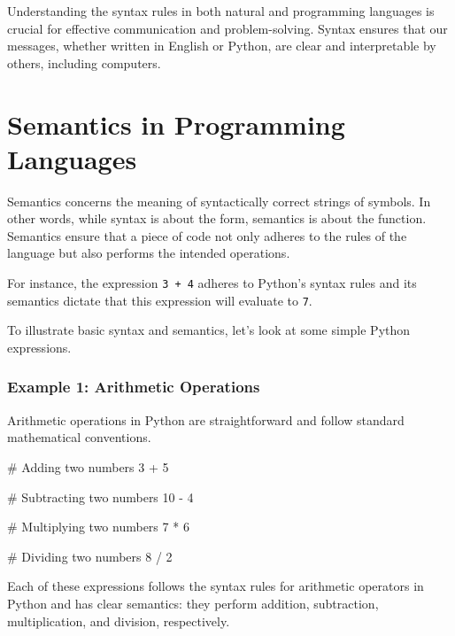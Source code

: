 \documentclass[
  letterpaper,
  DIV=11,
  numbers=noendperiod]{scrreprt}
\newenvironment{Shaded}{\begin{snugshade}}{\end{snugshade}}
\newcommand{\CommentTok}[1]{\textcolor[rgb]{0.37,0.37,0.37}{#1}}
\newcommand{\DecValTok}[1]{\textcolor[rgb]{0.68,0.00,0.00}{#1}}
\newcommand{\OperatorTok}[1]{\textcolor[rgb]{0.37,0.37,0.37}{#1}}
\begin{document}
Understanding the syntax rules in both natural and programming languages
is crucial for effective communication and problem-solving. Syntax
ensures that our messages, whether written in English or Python, are
clear and interpretable by others, including computers.

\hypertarget{semantics-in-programming-languages}{%
\section{Semantics in Programming
Languages}\label{semantics-in-programming-languages}}

Semantics concerns the meaning of syntactically correct strings of
symbols. In other words, while syntax is about the form, semantics is
about the function. Semantics ensure that a piece of code not only
adheres to the rules of the language but also performs the intended
operations.

For instance, the expression \texttt{3\ +\ 4} adheres to Python's syntax
rules and its semantics dictate that this expression will evaluate to
\texttt{7}.

To illustrate basic syntax and semantics, let's look at some simple
Python expressions.

\hypertarget{example-1-arithmetic-operations}{%
\subsubsection{Example 1: Arithmetic
Operations}\label{example-1-arithmetic-operations}}

Arithmetic operations in Python are straightforward and follow standard
mathematical conventions.

\begin{Shaded}
\begin{Highlighting}[]
\CommentTok{\# Adding two numbers}
\DecValTok{3} \OperatorTok{+} \DecValTok{5}

\CommentTok{\# Subtracting two numbers}
\DecValTok{10} \OperatorTok{{-}} \DecValTok{4}

\CommentTok{\# Multiplying two numbers}
\DecValTok{7} \OperatorTok{*} \DecValTok{6}

\CommentTok{\# Dividing two numbers}
\DecValTok{8} \OperatorTok{/} \DecValTok{2}
\end{Highlighting}
\end{Shaded}

Each of these expressions follows the syntax rules for arithmetic
operators in Python and has clear semantics: they perform addition,
subtraction, multiplication, and division, respectively.
\end{document}
